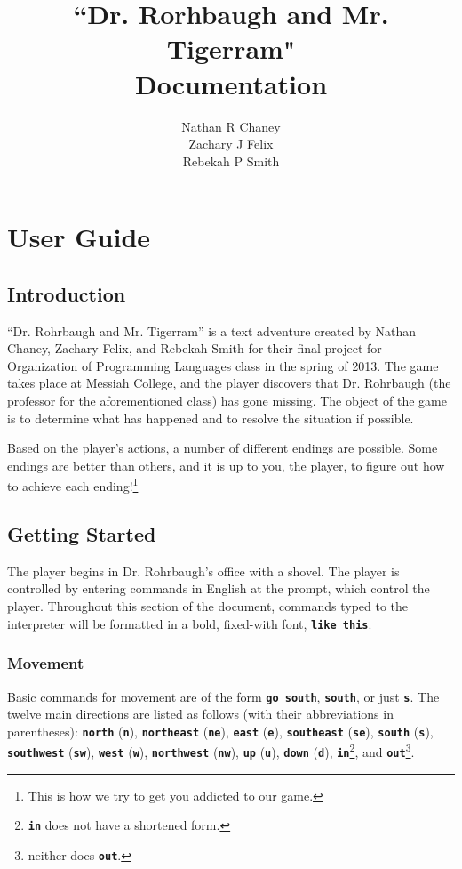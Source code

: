 \documentclass{report}
\begin{document}
\title{``Dr. Rorhbaugh and Mr. Tigerram" \\ Documentation}
\author{Nathan R Chaney \\ Zachary J Felix \\ Rebekah P Smith}
\maketitle

\tableofcontents

\part{User Guide}
\chapter{Introduction}
``Dr. Rohrbaugh and Mr. Tigerram'' is a text adventure created by Nathan Chaney, Zachary Felix, and Rebekah Smith for their final project for Organization of Programming Languages class in the spring of 2013.  The game takes place at Messiah College, and the player discovers that Dr. Rohrbaugh (the professor for the aforementioned class) has gone missing. The object of the game is to determine what has happened and to resolve the situation if possible.

Based on the player's actions, a number of different endings are possible. Some endings are better than others, and it is up to you, the player, to figure out how to achieve each ending!\footnote{This is how we try to get you addicted to our game.}

\chapter{Getting Started}
The player begins in Dr. Rohrbaugh's office with a shovel. The player is controlled by entering commands in English at the prompt, which control the player. Throughout this section of the document, commands typed to the interpreter will be formatted in a bold, fixed-with font, {\tt \bf like this}.

\section{Movement}
Basic commands for movement are of the form {\tt \bf go south}, {\tt \bf south}, or just {\tt \bf s}. The twelve main directions are listed as follows (with their abbreviations in parentheses): {\tt \bf north} ({\tt \bf n}), {\tt \bf northeast} ({\tt \bf ne}), {\tt \bf east} ({\tt \bf e}), {\tt \bf southeast} ({\tt \bf se}), {\tt \bf south} ({\tt \bf s}), {\tt \bf southwest} ({\tt \bf sw}), {\tt \bf west} ({\tt \bf w}), {\tt \bf northwest} ({\tt \bf nw}), {\tt \bf up} ({\tt \bf u}), {\tt \bf down} ({\tt \bf d}), {\tt \bf in}\footnote{{\tt \bf in} does not have a shortened form.}, and {\tt \bf out}\footnote{neither does {\tt \bf out}.}.
\end{document}
